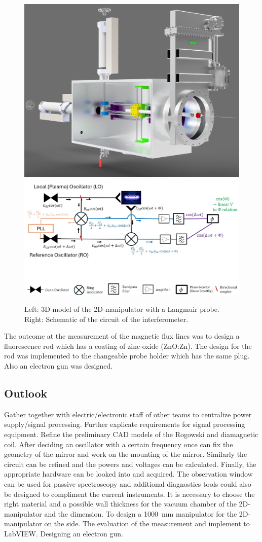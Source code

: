 \begin{figure}[h]
    \includegraphics[width=0.4\linewidth]{Images/04_Diagnostics/CAD_2D_manipulator.png}
    \includegraphics[width=0.59\linewidth]{Images/04_Diagnostics/interferometer_circuit_schematic.JPG}
    \caption{Left: 3D-model of the 2D-manipulator with a Langmuir probe.  Right: Schematic of the circuit of the interferometer.}
    \label{fig:2D-manipulator and probe tip and interferometer_circuit_schematic}
\end{figure}



The outcome at the measurement of the magnetic flux lines was to design a fluorescence rod which has a coating of zinc-oxide (ZnO:Zn). The design for the rod was implemented to the changeable probe holder which has the same plug. Also an electron gun was designed.


\subsection{Outlook}


Gather together with electric/electronic staff  of other teams to
centralize power supply/signal processing.
Further explicate requirements for signal processing equipment.
Refine the preliminary
CAD models of the Rogowski and diamagnetic coil.
After deciding an oscillator with a certain frequency once can fix the geometry of the mirror and work on the mounting of the mirror. Similarly the circuit can be refined and the powers and voltages can be calculated. Finally, the appropriate hardware can be looked into and acquired.
The observation window can be used for passive spectroscopy and additional diagnostics tools could also be designed to compliment the current instruments. It is necessary to choose the right material and a possible wall thickness for the vacuum chamber of the 2D-manipulator and the dimension. To design a 1000~mm manipulator for the 2D-manipulator on the side. The evaluation of the measurement and implement to LabVIEW. Designing an electron gun.


